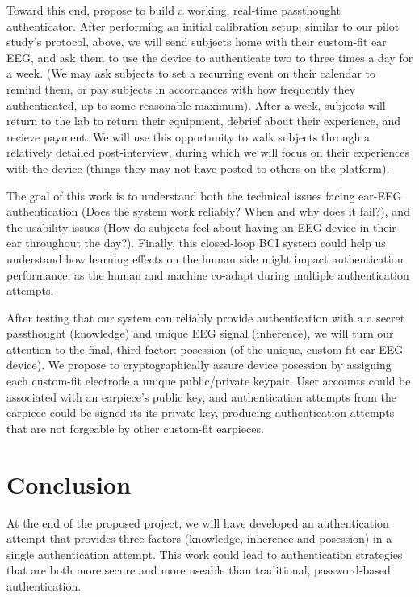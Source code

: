 \documentclass[11pt]{article}
\begin{document}
Toward this end, propose to build a working, real-time passthought authenticator.
After performing an initial calibration setup, similar to our pilot study's protocol, above,
we will send subjects home with their custom-fit ear EEG, and ask them to use the device to authenticate
two to three times a day for a week.
(We may ask subjects to set a recurring event on their calendar to remind them, 
or pay subjects in accordances with how frequently they authenticated, up to some reasonable maximum).
After a week, subjects will return to the lab to return their equipment, debrief about their experience, and recieve payment. We will use this opportunity to walk subjects through a relatively detailed post-interview,
during which we will focus on their experiences with the device (things they may not have posted to others on the platform).

The goal of this work is to understand both the technical issues facing ear-EEG authentication
(Does the system work reliably? When and why does it fail?), and the usability issues
(How do subjects feel about having an EEG device in their ear throughout the day?).
Finally, this closed-loop BCI system could help us understand how learning effects
on the human side might impact authentication performance, as the human and machine
co-adapt during multiple authentication attempts.

After testing that our system can reliably provide authentication with a 
a secret passthought (knowledge) and unique EEG signal (inherence),
we will turn our attention to the final, third factor: posession
(of the unique, custom-fit ear EEG device).
We propose to cryptographically assure device posession
by assigning each custom-fit electrode a unique public/private keypair. 
User accounts could be associated with an earpiece's public key,
and authentication attempts from the earpiece could be signed its
its private key, producing authentication attempts that are not
forgeable by other custom-fit earpieces. 

\section{Conclusion}
At the end of the proposed project,
we will have developed an authentication attempt that provides three factors
(knowledge, inherence and posession) in a single authentication attempt.
This work could lead to authentication strategies that are both more secure
and more useable than traditional, password-based authentication.
\end{document}
